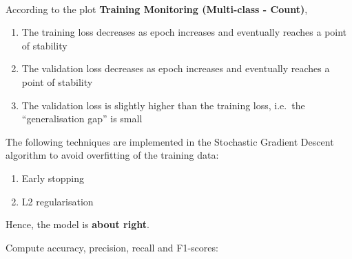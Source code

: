 \documentclass[11pt]{article}
\providecommand{\tightlist}{%
      \setlength{\itemsep}{0pt}\setlength{\parskip}{0pt}}
\begin{document}
    \begin{center}
    \end{center}
    { \hspace*{\fill} \\}

    According to the plot \textbf{Training Monitoring (Multi-class -
Count)},

\begin{enumerate}
\def\labelenumi{\arabic{enumi}.}
\tightlist
\item
  The training loss decreases as epoch increases and eventually reaches
  a point of stability
\item
  The validation loss decreases as epoch increases and eventually
  reaches a point of stability
\item
  The validation loss is slightly higher than the training loss,
  i.e.~the ``generalisation gap'' is small
\end{enumerate}

The following techniques are implemented in the Stochastic Gradient
Descent algorithm to avoid overfitting of the training data:

\begin{enumerate}
\def\labelenumi{\arabic{enumi}.}
\tightlist
\item
  Early stopping
\item
  L2 regularisation
\end{enumerate}

Hence, the model is \textbf{about right}.

    Compute accuracy, precision, recall and F1-scores:
\end{document}
